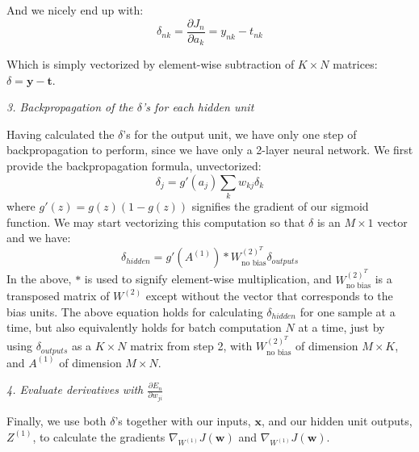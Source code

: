 \documentclass[10pt]{article}
\begin{document}
And we nicely end up with:
%
%
\begin{equation}
\delta_{nk} = \frac{\partial J_n}{\partial a_k} =  y_{nk} - t_{nk}
\end{equation}
%
%

Which is simply vectorized by element-wise subtraction of $K \times N$ matrices: $\delta = \mathbf{y} - \mathbf{t}$.



\textit{3. Backpropagation of the $\delta$'s for each hidden unit}

Having calculated the $\delta$'s for the output unit, we have only one step of backpropagation to perform, since we have only a 2-layer neural network.  We first provide the backpropagation formula, unvectorized:
%
%
\begin{equation}
\delta_j = g'(a_j)\sum_k w_{kj} \delta_k
\end{equation}
%
%
where $g'(z)=g(z)(1-g(z))$ signifies the gradient of our sigmoid function. We may start vectorizing this computation so that $\delta$ is an $M \times 1$ vector and we have:
%
%
\begin{equation}
\delta_{hidden} = g'(A^{(1)}) * W^{(2)^T}_{\text{no bias}} \delta_{outputs}
\end{equation}
%
%
In the above, $*$ is used to signify element-wise multiplication, and $W^{(2)^T}_{\text{no bias}}$ is a transposed matrix of $W^{(2)}$ except without the vector that corresponds to the bias units.  The above equation holds for calculating $\delta_{hidden}$ for one sample at a time, but also equivalently holds for batch computation $N$ at a time, just by using $\delta_{outputs}$ as a $K \times N$ matrix from step 2, with $W^{(2)^T}_{\text{no bias}}$ of dimension $M \times K$, and $A^{(1)}$ of dimension $M \times N$.

\textit{4. Evaluate derivatives with $\frac{\partial E_n}{\partial w_{ji}}$}

Finally, we use both $\delta$'s together with our inputs, $\mathbf{x}$, and our hidden unit outputs, $Z^{(1)}$, to calculate the gradients $\nabla_{W^{(1)}} J(\mathbf{w})$ and $\nabla_{W^{(1)}} J(\mathbf{w})$.
\end{document}
